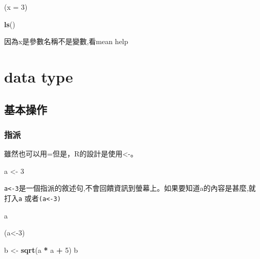 \documentclass[]{book}
\newenvironment{Shaded}{\begin{snugshade}}{\end{snugshade}}
\newcommand{\KeywordTok}[1]{\textcolor[rgb]{0.13,0.29,0.53}{\textbf{#1}}}
\newcommand{\DataTypeTok}[1]{\textcolor[rgb]{0.13,0.29,0.53}{#1}}
\newcommand{\DecValTok}[1]{\textcolor[rgb]{0.00,0.00,0.81}{#1}}
\newcommand{\StringTok}[1]{\textcolor[rgb]{0.31,0.60,0.02}{#1}}
\newcommand{\OperatorTok}[1]{\textcolor[rgb]{0.81,0.36,0.00}{\textbf{#1}}}
\newcommand{\NormalTok}[1]{#1}
\theoremstyle{definition}
\theoremstyle{definition}
\theoremstyle{definition}
\theoremstyle{remark}
\begin{document}
\begin{Shaded}
\begin{Highlighting}[]
\NormalTok{(}\DataTypeTok{x =} \DecValTok{3}\NormalTok{)}
\end{Highlighting}
\end{Shaded}

\begin{Shaded}
\begin{Highlighting}[]
\KeywordTok{ls}\NormalTok{()}
\end{Highlighting}
\end{Shaded}

因為x是參數名稱不是變數,看mean help

\chapter{data type}\label{data-type}

\section{基本操作}

\subsection{指派}

雖然也可以用=但是，R的設計是使用\textless{}-。

\begin{Shaded}
\begin{Highlighting}[]
\NormalTok{a <-}\StringTok{ }\DecValTok{3}
\end{Highlighting}
\end{Shaded}

\texttt{a\textless{}-3}是一個指派的敘述句,不會回饋資訊到螢幕上。如果要知道a的內容是甚麼,就打入\texttt{a}
或者\texttt{(a\textless{}-3)}

\begin{Shaded}
\begin{Highlighting}[]
\NormalTok{    a}
\end{Highlighting}
\end{Shaded}

\begin{Shaded}
\begin{Highlighting}[]
\NormalTok{(a<-}\DecValTok{3}\NormalTok{)}
\end{Highlighting}
\end{Shaded}

\begin{Shaded}
\begin{Highlighting}[]
\NormalTok{b <-}\StringTok{ }\KeywordTok{sqrt}\NormalTok{(a }\OperatorTok{*}\StringTok{ }\NormalTok{a }\OperatorTok{+}\StringTok{ }\DecValTok{5}\NormalTok{)}
\NormalTok{b}
\end{Highlighting}
\end{Shaded}
\end{document}
